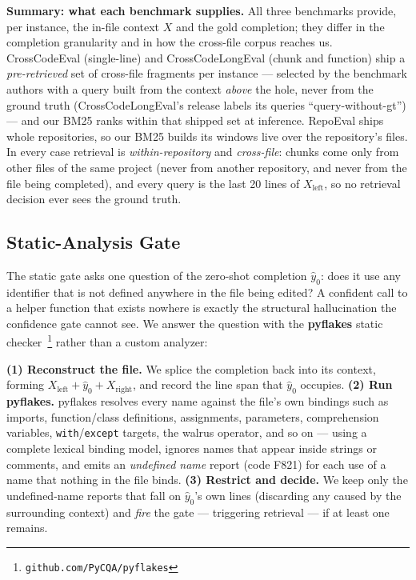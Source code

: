 \documentclass[10pt,conference]{IEEEtran}
\newcommand{\new}[1]{{\color{blue}#1}}
\newcommand{\ugr}[1]{{\color{revgreen}#1}}
\begin{document}
\ugr{\textbf{Summary: what each benchmark supplies.} All three benchmarks provide,
per instance, the in-file context $X$ and the gold completion; they differ in the
completion granularity and in how the cross-file corpus reaches us.
CrossCodeEval (single-line) and CrossCodeLongEval (chunk and function) ship a
\emph{pre-retrieved} set of cross-file fragments per instance --- selected by the
benchmark authors with a query built from the context \emph{above} the hole,
never from the ground truth (CrossCodeLongEval's release labels its queries
``query-without-gt'') --- and our BM25 ranks within that shipped set at
inference. RepoEval ships whole repositories, so our BM25 builds its windows
live over the repository's files. In every case retrieval is
\emph{within-repository} and \emph{cross-file}: chunks come only from other
files of the same project (never from another repository, and never from the
file being completed), and every query is the last 20 lines of
$X_{\text{left}}$, so no retrieval decision ever sees the ground truth.}

\subsection{Static-Analysis Gate}
\label{sec:analyzer}
\new{The static gate asks one question of the zero-shot completion $\hat{y}_0$:
does it use any identifier that is not defined anywhere in the file being edited?
A confident call to a helper function that exists nowhere is exactly the structural
hallucination the confidence gate cannot see. We answer the question with the
\textbf{pyflakes} static checker~\footnote{\texttt{github.com/PyCQA/pyflakes}}
rather than a custom analyzer:}

\new{\textbf{(1) Reconstruct the file.} We splice the completion back into its
context, forming $X_{\text{left}} + \hat{y}_0 + X_{\text{right}}$, and record the
line span that $\hat{y}_0$ occupies. \textbf{(2) Run pyflakes.} pyflakes resolves
every name against the file's own bindings such as imports, function/class
definitions, assignments, parameters, comprehension variables,
\texttt{with}/\texttt{except} targets, the walrus operator, and so on --- using a
complete lexical binding model, ignores names that appear inside strings or
comments, and emits an \emph{undefined name} report (code F821) for each use of a
name that nothing in the file binds. \textbf{(3) Restrict and decide.} We keep
only the undefined-name reports that fall on $\hat{y}_0$'s own lines (discarding
any caused by the surrounding context) and \ugr{\emph{fire} the gate ---
triggering retrieval --- if at least one remains.}}
\end{document}
